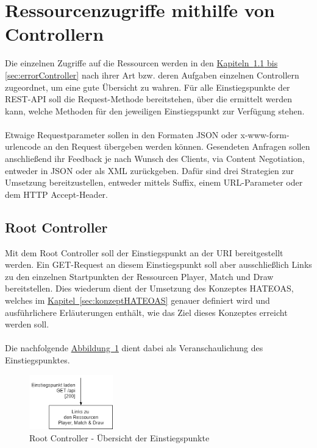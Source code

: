 \section{Ressourcenzugriffe mithilfe von Controllern}\label{sec:controller}
Die einzelnen Zugriffe auf die Ressourcen werden in den \hyperref[sec:rootController, sec:errorController]{Kapiteln~\ref{sec:rootController} bis \ref{sec:errorController}} nach ihrer Art bzw. deren Aufgaben einzelnen Controllern zugeordnet, um eine gute Übersicht zu wahren. Für alle Einstiegspunkte der \gls{REST}-\gls{API} soll die Request-Methode  bereitstehen, über die ermittelt werden kann, welche Methoden für den jeweiligen Einstiegspunkt zur Verfügung stehen.\\
\\
Etwaige Requestparameter sollen in den Formaten \gls{JSON} oder x-www-form-urlencode an den Request übergeben werden können. Gesendeten Anfragen sollen anschließend ihr Feedback je nach Wunsch des Clients, via Content Negotiation, entweder in \gls{JSON} oder als \gls{XML} zurückgeben. Dafür sind drei Strategien zur Umsetzung bereitzustellen, entweder mittels Suffix, einem URL-Parameter oder dem \gls{HTTP} Accept-Header. 

\subsection{Root Controller}\label{sec:rootController}
Mit dem Root Controller soll der Einstiegspunkt an der \gls{URI}  bereitgestellt werden. Ein GET-Request an diesem Einstiegspunkt soll aber ausschließlich Links zu den einzelnen Startpunkten der Ressourcen Player, Match und Draw bereitstellen. Dies wiederum dient der Umsetzung des Konzeptes HATEOAS, welches im \hyperref[sec:konzeptHATEOAS]{Kapitel~\ref{sec:konzeptHATEOAS}} genauer definiert wird und ausführlichere Erläuterungen enthält, wie das Ziel dieses Konzeptes erreicht werden soll.\\
\\
Die nachfolgende \hyperref[fig:rootController]{Abbildung~\ref{fig:rootController}} dient dabei als Veranschaulichung des Einstiegspunktes.\\
\begin{figure}[htb]
	\includegraphics[width=0.323\textwidth]{images/root-controller.png}
	\caption{Root Controller - Übersicht der Einstiegspunkte}
	\label{fig:rootController}
\end{figure}

